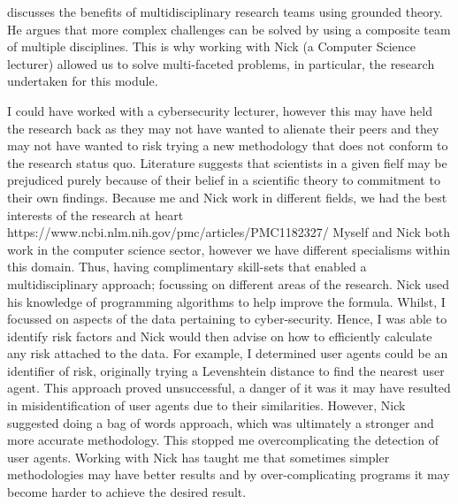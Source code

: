 \cite{thurow1999dynamics} discusses the benefits of multidisciplinary research teams using grounded theory. He argues that more complex challenges can be solved by using a composite team of multiple disciplines. This is why working with Nick (a Computer Science lecturer) allowed us to solve multi-faceted problems, in particular, the research undertaken for this module.

I could have worked with a cybersecurity lecturer, however this may have held the research back as they may not have wanted to alienate their peers and they may not have wanted to risk trying a new methodology that does not conform to the research status quo. Literature suggests that scientists in a given fielf may be prejudiced purely because of their belief in a scientific theory to commitment to their own findings. Because me and Nick work in different fields, we had the best interests of the research at heart https://www.ncbi.nlm.nih.gov/pmc/articles/PMC1182327/
 Myself and Nick both work in the computer science sector, however we have different specialisms within this domain. Thus, having complimentary skill-sets that enabled a multidisciplinary approach; focussing on different areas of the research. Nick used his knowledge of programming algorithms to help improve the formula. Whilst, I focussed on aspects of the data pertaining to cyber-security. Hence, I was able to identify risk factors and Nick would then advise on how to efficiently calculate any risk attached to the data. For example, I determined user agents could be an identifier of risk,  originally trying a Levenshtein distance to find the nearest user agent. This approach proved unsuccessful, a danger of it was it may have resulted in misidentification of user agents due to their similarities. However, Nick suggested doing a bag of words approach, which was ultimately a stronger and more accurate methodology. This stopped me overcomplicating the detection of user agents. Working with Nick has taught me that sometimes simpler methodologies may have better results and by over-complicating programs it may become harder to achieve the desired result.


